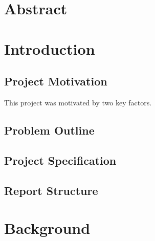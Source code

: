 \documentclass{article}
\begin{document}
\section{Abstract}

\section{Introduction}

\subsection{Project Motivation}

This project was motivated by two key factors. 

\subsection{Problem Outline}



\subsection{Project Specification}



\subsection{Report Structure}

\section{Background}
\end{document}
